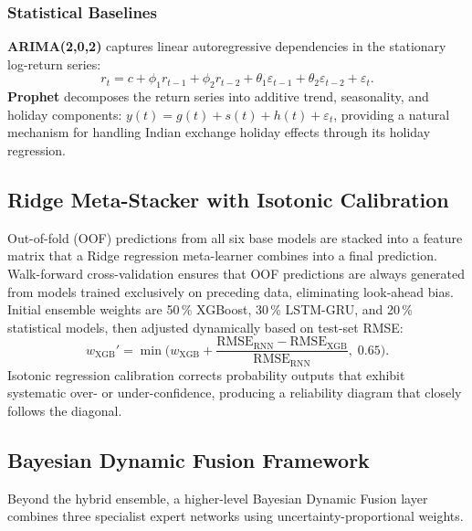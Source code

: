 \documentclass[ASNA,twocolumn]{USG}
\begin{document}
\subsubsection{Statistical Baselines}

\textbf{ARIMA(2,0,2)} \citep{box2015} captures linear autoregressive
dependencies in the stationary log-return series:
\begin{equation}
  r_t = c + \phi_1 r_{t-1} + \phi_2 r_{t-2}
      + \theta_1 \varepsilon_{t-1} + \theta_2 \varepsilon_{t-2}
      + \varepsilon_t.
  \label{eq:arima}
\end{equation}
\textbf{Prophet} \citep{taylor2018} decomposes the return series into additive
trend, seasonality, and holiday components:
$y(t) = g(t) + s(t) + h(t) + \varepsilon_t$, providing a natural mechanism for
handling Indian exchange holiday effects through its holiday regression.

\subsection{Ridge Meta-Stacker with Isotonic Calibration}

Out-of-fold (OOF) predictions from all six base models are stacked into a
feature matrix that a Ridge regression meta-learner combines into a final
prediction. Walk-forward cross-validation ensures that OOF predictions are
always generated from models trained exclusively on preceding data,
eliminating look-ahead bias. Initial ensemble weights are 50\,\% XGBoost,
30\,\% LSTM-GRU, and 20\,\% statistical models, then adjusted dynamically
based on test-set RMSE:
\begin{equation}
  w_\text{XGB}' = \min\!\biggl(w_\text{XGB}
    + \frac{\text{RMSE}_\text{RNN}-\text{RMSE}_\text{XGB}}{\text{RMSE}_\text{RNN}},
    \; 0.65\biggr).
  \label{eq:dynweight}
\end{equation}
Isotonic regression calibration \citep{grinsztajn2022} corrects probability
outputs that exhibit systematic over- or under-confidence, producing a
reliability diagram that closely follows the diagonal.

\subsection{Bayesian Dynamic Fusion Framework}

Beyond the hybrid ensemble, a higher-level Bayesian Dynamic Fusion layer
combines three specialist expert networks using uncertainty-proportional weights.
\end{document}
